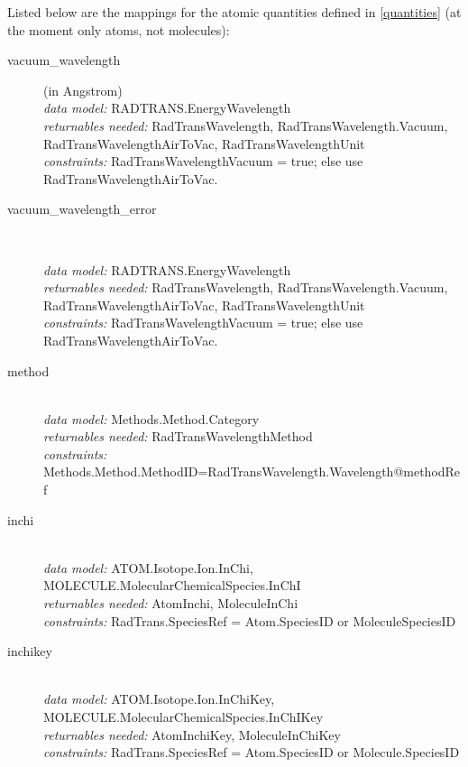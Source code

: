 \documentclass[11pt,a4paper]{ivoa}
\begin{document}
Listed below are the mappings for the atomic quantities defined in \ref{quantities} (at the 
moment only atoms, not molecules):

\renewcommand{\descriptionlabel}[1]{\hspace{\labelsep}\texttt{#1}}
\begin{description}

\item [vacuum\_wavelength] (in Angstrom)\hfill\\
    \textit{data model:} RADTRANS.EnergyWavelength\\
	\textit{returnables needed:} RadTransWavelength, RadTransWavelength.Vacuum, 
RadTransWavelengthAirToVac, RadTransWavelengthUnit\\
	\textit{constraints:} RadTransWavelengthVacuum = true; else use 
RadTransWavelengthAirToVac.\\
	
\item [vacuum\_wavelength\_error]  \hfill\\

    \textit{data model:} RADTRANS.EnergyWavelength\\
	\textit{returnables needed:} RadTransWavelength, RadTransWavelength.Vacuum, 
RadTransWavelengthAirToVac, RadTransWavelengthUnit\\
	\textit{constraints:} RadTransWavelengthVacuum = true; else use 
RadTransWavelengthAirToVac.\\
	
\item [method] \hfill\\
	\textit{data model:} Methods.Method.Category\\
	\textit{returnables needed:} RadTransWavelengthMethod\\
	\textit{constraints:} 
Methods.Method.MethodID=RadTransWavelength.Wavelength@methodRef\\

\item [inchi] \hfill\\
	\textit{data model:} ATOM.Isotope.Ion.InChi,  
MOLECULE.MolecularChemicalSpecies.InChI\\
        \textit{returnables needed:} AtomInchi, MoleculeInChi\\
	\textit{constraints:} RadTrans.SpeciesRef = Atom.SpeciesID or MoleculeSpeciesID
	
\item [inchikey] \hfill\\
	\textit{data model:} ATOM.Isotope.Ion.InChiKey, 
MOLECULE.MolecularChemicalSpecies.InChIKey \\
         \textit{returnables needed:} AtomInchiKey, MoleculeInChiKey\\
         \textit{constraints:} RadTrans.SpeciesRef = Atom.SpeciesID or  Molecule.SpeciesID


\end{description}
\end{document}
